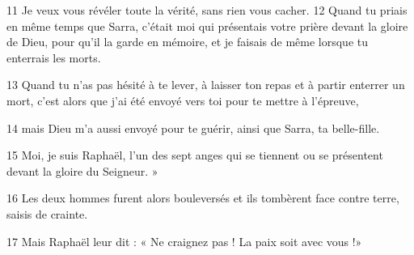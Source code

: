 
11 Je veux vous révéler toute la vérité, sans rien vous cacher. 
12 
Quand tu priais en même temps que Sarra, c’était moi qui présentais votre prière devant la gloire de Dieu, pour qu’il la garde en mémoire, et je faisais de même lorsque tu enterrais les morts.

13 Quand tu n’as pas hésité à te lever, à laisser ton repas et à partir enterrer un mort, c’est alors que j’ai été envoyé vers toi pour te mettre à l’épreuve,

14 mais Dieu m’a aussi envoyé pour te guérir, ainsi que Sarra, ta belle-fille.

15 Moi, je suis Raphaël, l’un des sept anges qui se tiennent ou se présentent devant la gloire du Seigneur. »

16 Les deux hommes furent alors bouleversés et ils tombèrent face contre terre, saisis de crainte.

17 Mais Raphaël leur dit : « Ne craignez pas ! La paix soit avec vous !»